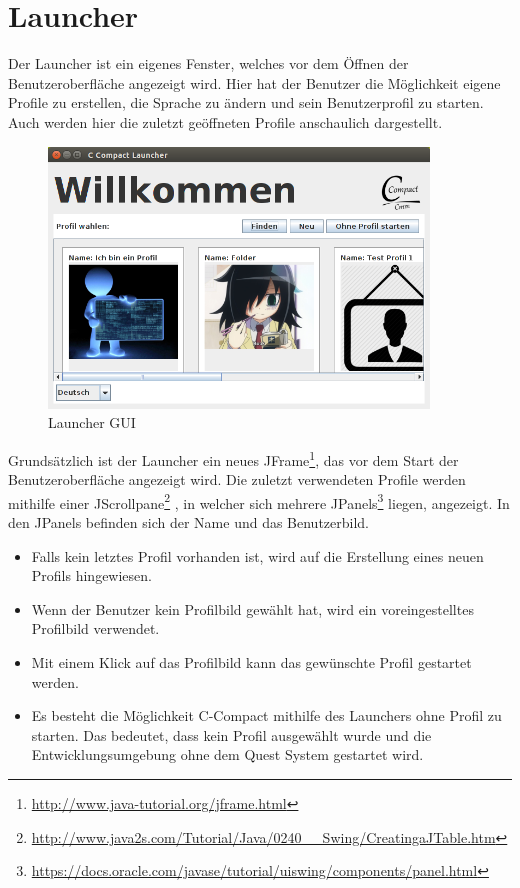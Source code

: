\section{Launcher}
Der Launcher ist ein eigenes Fenster, welches vor dem Öffnen der Benutzeroberfläche angezeigt wird. Hier hat der Benutzer die Möglichkeit eigene Profile zu erstellen, die Sprache zu ändern und sein Benutzerprofil zu starten. Auch werden hier die zuletzt geöffneten Profile anschaulich dargestellt.

\begin{figure}[h] 
  \centering
     \includegraphics[width=0.9\textwidth]{./media/images/gui/launcher/launcher_main.png}
  \caption{Launcher GUI}
  \label{fig:Bild1}
\end{figure}

Grundsätzlich ist der Launcher ein neues JFrame\footnote{\url{http://www.java-tutorial.org/jframe.html}}, das vor dem Start der Benutzeroberfläche angezeigt wird. Die zuletzt verwendeten Profile werden mithilfe einer JScrollpane\footnote{\url{http://www.java2s.com/Tutorial/Java/0240__Swing/CreatingaJTable.htm}}  , in welcher sich mehrere JPanels\footnote{\url{https://docs.oracle.com/javase/tutorial/uiswing/components/panel.html}} liegen, angezeigt. In den JPanels befinden sich der Name und das Benutzerbild.

\begin{itemize}
\item Falls kein letztes Profil vorhanden ist, wird auf die Erstellung eines neuen Profils hingewiesen.
\item Wenn der Benutzer kein Profilbild gewählt hat, wird ein voreingestelltes Profilbild verwendet.
\item Mit einem Klick auf das Profilbild kann das gewünschte Profil gestartet werden.
\item Es besteht die Möglichkeit C-Compact mithilfe des Launchers ohne Profil zu starten. Das bedeutet, dass kein Profil ausgewählt wurde und die Entwicklungsumgebung ohne dem Quest System gestartet wird.
\end{itemize}

